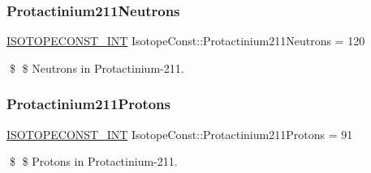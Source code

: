 \subsubsection{\texorpdfstring{Protactinium211\+Neutrons}{Protactinium211Neutrons}}
{\footnotesize\ttfamily \mbox{\hyperlink{group___isotope_const-_macros_ga5f18360b3e99483a35c32d789e62621c}{I\+S\+O\+T\+O\+P\+E\+C\+O\+N\+S\+T\+\_\+\+I\+NT}} Isotope\+Const\+::\+Protactinium211\+Neutrons = 120}

\$ \$ Neutrons in Protactinium-\/211. \mbox{\label{group___isotope_const-_protactinium-_pa211_ga734a318e0095d03597043b2b1640df6d}} 
\subsubsection{\texorpdfstring{Protactinium211\+Protons}{Protactinium211Protons}}
{\footnotesize\ttfamily \mbox{\hyperlink{group___isotope_const-_macros_ga5f18360b3e99483a35c32d789e62621c}{I\+S\+O\+T\+O\+P\+E\+C\+O\+N\+S\+T\+\_\+\+I\+NT}} Isotope\+Const\+::\+Protactinium211\+Protons = 91}

\$ \$ Protons in Protactinium-\/211. 